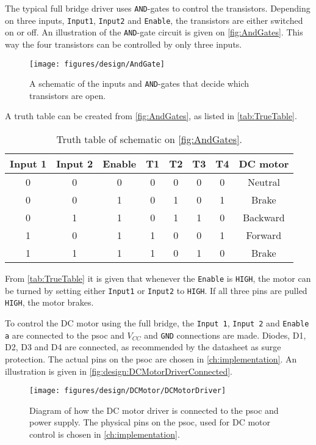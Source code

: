 The typical full bridge driver uses \texttt{AND}-gates to control the transistors. Depending on three inputs, \texttt{Input1}, \texttt{Input2} and \texttt{Enable}, the transistors are either switched on or off. An illustration of the \texttt{AND}-gate circuit is given on \autoref{fig:AndGates}. This way the four transistors can be controlled by only three inputs. 
\begin{figure}[h!]
	\centering
	\texttt{[image: figures/design/AndGate]}
	\caption{A schematic of the inputs and \texttt{AND}-gates that decide which transistors are open.}
	\label{fig:AndGates}
\end{figure}

A truth table can be created from \autoref{fig:AndGates}, as listed in \autoref{tab:TrueTable}.

\begin{table}[h!]
	\centering
	\caption{Truth table of schematic on \autoref{fig:AndGates}.} \label{tab:TrueTable}
	\begin{tabular}{ c c c | c c c c | c }
		\textbf{Input 1} & \textbf{Input 2} & \textbf{Enable} & \textbf{T1} & \textbf{T2} & \textbf{T3} & \textbf{T4} & \textbf{DC motor}	\\ 
		\hline \rowcolor{lightGrey}
	0 & 0 & 0 & 0 & 0 & 0 & 0 & Neutral 		\\ 
	0 & 0 & 1 & 0 & 1 & 0 & 1 & Brake 			\\ \rowcolor{lightGrey}
	0 & 1 & 1 & 0 & 1 & 1 & 0 & Backward 		\\ 
	1 & 0 & 1 & 1 & 0 & 0 & 1 & Forward 		\\ \rowcolor{lightGrey}
	1 & 1 & 1 & 1 & 0 & 1 & 0 & Brake 			\\ 
	\end{tabular}
\end{table} 
From \autoref{tab:TrueTable} it is given that whenever the \texttt{Enable} is \texttt{HIGH}, the motor can be turned by setting either \texttt{Input1} or \texttt{Input2} to \texttt{HIGH}. If all three pins are pulled \texttt{HIGH}, the motor brakes. 

To control the DC motor using the full bridge, the \texttt{Input 1}, \texttt{Input 2} and \texttt{Enable a} are connected to the \gls{psoc} and $V_{CC}$ and \texttt{GND} connections are made. 
Diodes, D1, D2, D3 and D4 are connected, as recommended by the datasheet \cite{datasheet:L298} as surge protection. The actual pins on the \gls{psoc} are chosen in \autoref{ch:implementation}. An illustration is given in \autoref{fig:design:DCMotorDriverConnected}.
\begin{figure}[h!]
\centering
\texttt{[image: figures/design/DCMotor/DCMotorDriver]}
\caption{Diagram of how the DC motor driver is connected to the \gls{psoc} and power supply. The physical pins on the \gls{psoc}, used for DC motor control is chosen in \autoref{ch:implementation}.}\label{fig:design:DCMotorDriverConnected}
\end{figure}

